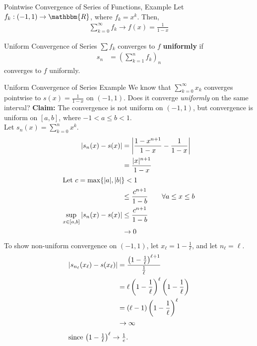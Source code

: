 \documentclass[10pt]{extarticle}
\newcommand{\R}{\mathbbm{R}}
\begin{document}
  \begin{problem}{Pointwise Convergence of Series of Functions, Example}
    Let $f_k: (-1,1) \rightarrow \R$, where $f_k = x^k$. Then,
    \begin{align*}
      \sum_{k=0}^{\infty}f_k \rightarrow f(x) = \frac{1}{1-x}
    \end{align*}
  \end{problem}
  \begin{problem}{Uniform Convergence of Series}
    $\sum f_k$ converges to $f$ \textbf{uniformly} if
    \begin{align*}
      s_n &= \left(\sum_{k=1}^{n} f_k\right)_n
    \end{align*}
    converges to $f$ uniformly.
  \end{problem}
  \begin{problem}{Uniform Convergence of Series Example}
    We know that $\sum_{k=0}^{\infty} x_k$ converges pointwise to $s(x) = \frac{1}{1-x}$ on $(-1,1)$. Does it converge \textit{uniformly} on the same interval?
    \tcblower
    \textbf{Claim:} The convergence is not uniform on $(-1,1)$, but convergence is uniform on $[a,b]$, where $-1 < a \leq b < 1 $.\\

    Let $s_n(x) = \sum_{k=0}^{n}x^k$.
    \begin{align*}
      |s_n(x) - s(x)| &= \left\vert\frac{1-x^{n+1}}{1-x} - \frac{1}{1-x}\right\vert\\
                      &= \frac{|x|^{n+1}}{1-x}\\
      \shortintertext{Let $c = \max\{|a|,|b|\} < 1$}
                      &\leq \frac{c^{n+1}}{1-b}\tag*{$\forall a \leq x \leq b$}\\
      \sup_{x\in[a,b]}|s_n(x) - s(x)| &\leq \frac{c^{n+1}}{1-b}\\
                                      &\rightarrow 0
    \end{align*}
    To show non-uniform convergence on $(-1,1)$, let $x_{\ell} = 1 - \frac{1}{\ell}$, and let $n_{\ell} = \ell$.
    \begin{align*}
      \left|s_{n_{\ell}}(x_{\ell}) - s(x_{\ell})\right| &= \frac{\left(1-\frac{1}{\ell}\right)^{\ell+1}}{\frac{1}{\ell}}\\
                                                        &= \ell\left(1-\frac{1}{\ell}\right)^{\ell}\left(1-\frac{1}{\ell}\right)\\
                                                        &= (\ell - 1)\left(1-\frac{1}{\ell}\right)^{\ell}\\
                                                        &\rightarrow \infty\\
      \shortintertext{since $\left(1-\frac{1}{\ell}\right)^{\ell}\rightarrow \frac{1}{e}$.}
    \end{align*}
  \end{problem}
\end{document}
